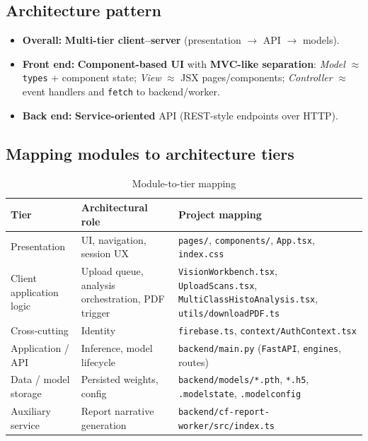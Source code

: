 \documentclass[12pt,a4paper]{report}
\begin{document}
\subsection{Architecture pattern}

\begin{itemize}
  \item \textbf{Overall:} \textbf{Multi-tier client--server} (presentation $\rightarrow$ API $\rightarrow$ models).
  \item \textbf{Front end:} \textbf{Component-based UI} with \textbf{MVC-like separation}: \emph{Model} $\approx$ \texttt{types} + component state; \emph{View} $\approx$ JSX pages/components; \emph{Controller} $\approx$ event handlers and \texttt{fetch} to backend/worker.
  \item \textbf{Back end:} \textbf{Service-oriented} API (REST-style endpoints over HTTP).
\end{itemize}

\subsection{Mapping modules to architecture tiers}

\begin{table}[htbp]
  \centering
  \footnotesize
  \caption{Module-to-tier mapping}
  \begin{tabular}{@{}p{}p{}p{}@{}}
    \toprule
    \textbf{Tier} & \textbf{Architectural role} & \textbf{Project mapping} \\
    \midrule
    Presentation & UI, navigation, session UX & \texttt{pages/}, \texttt{components/}, \texttt{App.tsx}, \texttt{index.css} \\
    Client application logic & Upload queue, analysis orchestration, PDF trigger & \texttt{VisionWorkbench.tsx}, \texttt{UploadScans.tsx}, \texttt{MultiClassHistoAnalysis.tsx}, \texttt{utils/downloadPDF.ts} \\
    Cross-cutting & Identity & \texttt{firebase.ts}, \texttt{context/AuthContext.tsx} \\
    Application / API & Inference, model lifecycle & \texttt{backend/main.py} (\texttt{FastAPI}, \texttt{engines}, routes) \\
    Data / model storage & Persisted weights, config & \texttt{backend/models/*.pth}, \texttt{*.h5}, \texttt{.modelstate}, \texttt{.modelconfig} \\
    Auxiliary service & Report narrative generation & \texttt{backend/cf-report-worker/src/index.ts} \\
    \bottomrule
  \end{tabular}
\end{table}
\end{document}

